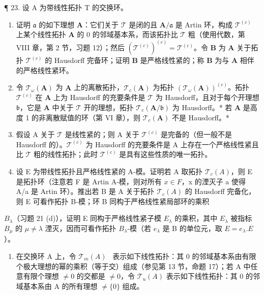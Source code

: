 ¶ 23. 设 A 为带线性拓扑 T 的交换环。

\begin{enumerate}
\def\labelenumi{(\alph{enumi})}
\item
  证明 \(\mathfrak{a}\) 的如下理想 \(\mathbf{A}\)：它们关于 \(\mathcal{T}\) 是闭的且 \(\mathbf{A} / \mathfrak{a}\) 是 Artin 环，构成 \(\mathcal{T}^{(c)}\) 上某个线性拓扑 \(\mathbf{A}\) 的 0 的邻域基本系，而该拓扑比 \(\mathcal{T}\) 粗（使用代数，第 VIII 章，第 2 节，习题 12）；然后 \((\mathcal{T}^{(c)})^{(c)} = \mathcal{T}^{(c)}\)。令 \(\mathbf{B}\) 为 \(\mathbf{A}\) 关于拓扑 \(\mathcal{T}^{(c)}\) 的 Hausdorff 完备环；证明 \(\mathbf{B}\) 是严格线性紧的；称 \(\mathbf{B}\) 为与 \(\mathbf{A}\) 相伴的严格线性紧环。
\item
  令 \(\mathcal{T}_{\omega}(\mathbf{A})\) 为 \(\mathbf{A}\) 上的离散拓扑，\(\mathcal{T}_c(\mathbf{A})\) 为拓扑 \((\mathcal{T}_{\omega}(\mathbf{A}))^{(c)}\)。拓扑 \(\mathcal{T}^{(c)}\) 在 \(\mathbf{A}\) 上为 Hausdorff 的充要条件是 \(\mathcal{T}\) 为 Hausdorff，且对于每个开理想 \(\mathfrak{b}\)，它是 \(\mathbf{A}\) 中关于 \(\mathcal{T}\) 开的理想，拓扑 \(\mathcal{T}_c(\mathbf{A}/\mathfrak{b})\) 为 Hausdorff。* 若 \(\mathbf{A}\) 是高度 1 的非离散赋值的环（第 VI 章），则 \(\mathcal{T}_c(\mathbf{A})\) 不是 Hausdorff。*
\item
  假设 A 关于 \(\mathcal{T}\) 是线性紧的；则 A 关于 \(\mathcal{T}^{(c)}\) 是完备的（但一般不是 Hausdorff 的）。\(\mathcal{T}^{(c)}\) 为 Hausdorff 的充要条件是 A 上存在一个严格线性紧且比 \(\mathcal{T}\) 粗的线性拓扑；此时 \(\mathcal{T}^{(c)}\) 是具有这些性质的唯一拓扑。
\item
  设 E 为带线性拓扑且严格线性紧的 A-模。证明若 A 取拓扑 \(\mathcal{T}_{c}(A)\)，则 E 是拓扑环（注意若 F 是 Artin A-模，则对所有 \(x \in F\)，x 的湮灭子 a 使得 A/a 是 Artin 环）。推出若 B 是 A 关于拓扑 \(\mathcal{T}_{c}(A)\) 的 Hausdorff 完备化，则 E 可看作拓扑 B-模；环 B 同构于严格线性紧局部环的乘积
\end{enumerate}

\(B_{\lambda}\)（习题 21 (d)），证明 E 同构于严格线性紧子模 \(E_{\lambda}\) 的乘积，其中 \(E_{\lambda}\) 被指标 \(B_{\mu}\) 的 \(\mu \neq \lambda\) 湮灭，因而可看作拓扑 \(B_{\lambda}\)-模（若 \(e_{\lambda}\) 是 B 的单位元，取 \(E = e_{\lambda}.E\)）。

\begin{enumerate}
\def\labelenumi{\arabic{enumi}.}
\setcounter{enumi}{23}
\tightlist
\item
  在交换环 A 上，令 \(\mathcal{T}_{m}(A)\)~ 表示如下线性拓扑：其 0 的邻域基本系由有限个极大理想的幂的乘积（等于交）组成（参见第 13 节，命题 17）；若 A 中任意有限个理想 \(\neq0\) 的交都是 \(\neq0\)，令 \(\mathcal{T}_{u}(A)\) 表示如下线性拓扑：其 0 的邻域基本系由 A 的所有理想 \(\neq\{0\}\) 组成。
\end{enumerate}

